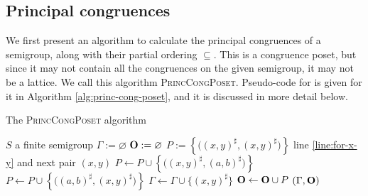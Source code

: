 \subsection{Principal congruences}
\label{sec:princ-cong-poset}

We first present an algorithm to calculate the principal congruences of a
semigroup, along with their partial ordering $\subseteq$.  This is a congruence
poset, but since it may not contain all the congruences on the given semigroup,
it may not be a lattice.  We call this algorithm \textsc{PrincCongPoset}.
Pseudo-code for is given for it in Algorithm \ref{alg:princ-cong-poset}, and it
is discussed in more detail below.

\begin{algorithm}
  \caption{The \textsc{PrincCongPoset} algorithm}
  \label{alg:princ-cong-poset}
  \begin{algorithmic}[1]
    \Require $S$ a finite semigroup
      \State $\Gamma := \varnothing$
      \State $\mathbf{O} := \varnothing$
       \label{line:for-x-y}
        \State $P := \left\{\big((x,y)^\sharp, (x,y)^\sharp\big)\right\}$
              \State \Goto line \ref{line:for-x-y} and next pair $(x,y)$
            \Else
              \State $P \gets P \cup
                \left\{\big((x,y)^\sharp, (a,b)^\sharp\big)\right\}$
            \EndIf
              \State $P \gets P \cup
                \left\{\big((a,b)^\sharp, (x,y)^\sharp\big)\right\}$
          \EndIf
        \EndFor
        \State $\Gamma \gets \Gamma \cup \{(x,y)^\sharp\}$
        \State $\mathbf{O} \gets \mathbf{O} \cup P$
      \EndFor
      \State \Return $(\Gamma, \mathbf{O})$
    \EndProcedure
  \end{algorithmic}
\end{algorithm}

